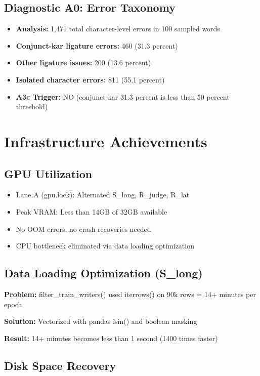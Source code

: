 \documentclass[12pt,a4paper]{article}
\begin{document}
\subsection{Diagnostic A0: Error Taxonomy}

\begin{itemize}
  \item \textbf{Analysis:} 1,471 total character-level errors in 100 sampled words
  \item \textbf{Conjunct-kar ligature errors:} 460 (31.3 percent)
  \item \textbf{Other ligature issues:} 200 (13.6 percent)
  \item \textbf{Isolated character errors:} 811 (55.1 percent)
  \item \textbf{A3c Trigger:} NO (conjunct-kar 31.3 percent is less than 50 percent threshold)
\end{itemize}

\section{Infrastructure Achievements}

\subsection{GPU Utilization}

\begin{itemize}
  \item Lane A (gpu.lock): Alternated S\_long, R\_judge, R\_lat
  \item Peak VRAM: Less than 14GB of 32GB available
  \item No OOM errors, no crash recoveries needed
  \item CPU bottleneck eliminated via data loading optimization
\end{itemize}

\subsection{Data Loading Optimization (S\_long)}

\textbf{Problem:} filter\_train\_writers() used iterrows() on 90k rows = 14+ minutes per epoch

\textbf{Solution:} Vectorized with pandas isin() and boolean masking

\textbf{Result:} 14+ minutes becomes less than 1 second (1400 times faster)

\subsection{Disk Space Recovery}
\end{document}
